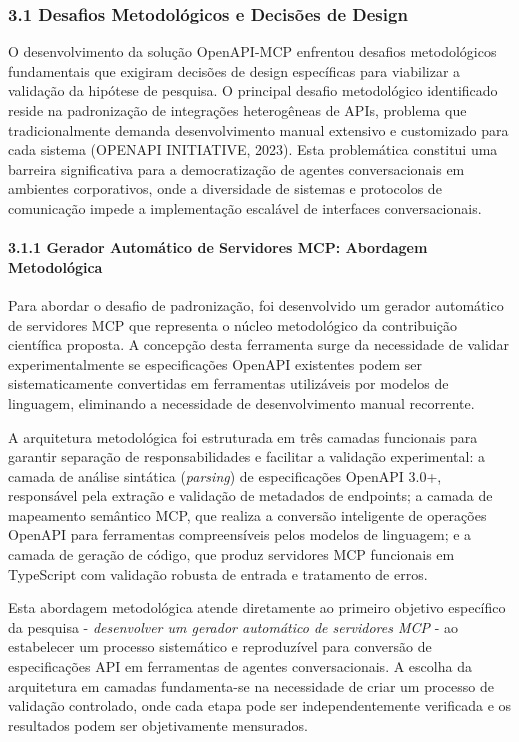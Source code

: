 \documentclass[
]{article}
\begin{document}
\subsubsection{3.1 Desafios Metodológicos e Decisões de
Design}\label{desafios-metodoluxf3gicos-e-decisuxf5es-de-design}

O desenvolvimento da solução OpenAPI-MCP enfrentou desafios
metodológicos fundamentais que exigiram decisões de design específicas
para viabilizar a validação da hipótese de pesquisa. O principal desafio
metodológico identificado reside na padronização de integrações
heterogêneas de APIs, problema que tradicionalmente demanda
desenvolvimento manual extensivo e customizado para cada sistema
(OPENAPI INITIATIVE, 2023). Esta problemática constitui uma barreira
significativa para a democratização de agentes conversacionais em
ambientes corporativos, onde a diversidade de sistemas e protocolos de
comunicação impede a implementação escalável de interfaces
conversacionais.

\paragraph{3.1.1 Gerador Automático de Servidores MCP: Abordagem
Metodológica}\label{gerador-automuxe1tico-de-servidores-mcp-abordagem-metodoluxf3gica}

Para abordar o desafio de padronização, foi desenvolvido um gerador
automático de servidores MCP que representa o núcleo metodológico da
contribuição científica proposta. A concepção desta ferramenta surge da
necessidade de validar experimentalmente se especificações OpenAPI
existentes podem ser sistematicamente convertidas em ferramentas
utilizáveis por modelos de linguagem, eliminando a necessidade de
desenvolvimento manual recorrente.

A arquitetura metodológica foi estruturada em três camadas funcionais
para garantir separação de responsabilidades e facilitar a validação
experimental: a camada de análise sintática (\emph{parsing}) de
especificações OpenAPI 3.0+, responsável pela extração e validação de
metadados de endpoints; a camada de mapeamento semântico MCP, que
realiza a conversão inteligente de operações OpenAPI para ferramentas
compreensíveis pelos modelos de linguagem; e a camada de geração de
código, que produz servidores MCP funcionais em TypeScript com validação
robusta de entrada e tratamento de erros.

Esta abordagem metodológica atende diretamente ao primeiro objetivo
específico da pesquisa - \emph{desenvolver um gerador automático de
servidores MCP} - ao estabelecer um processo sistemático e reproduzível
para conversão de especificações API em ferramentas de agentes
conversacionais. A escolha da arquitetura em camadas fundamenta-se na
necessidade de criar um processo de validação controlado, onde cada
etapa pode ser independentemente verificada e os resultados podem ser
objetivamente mensurados.
\end{document}

